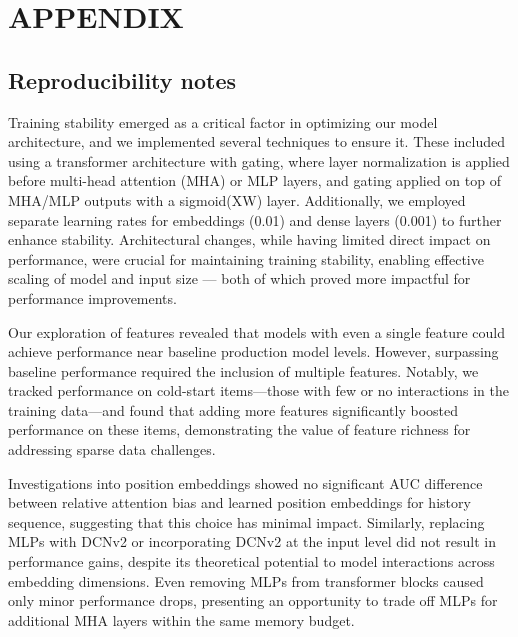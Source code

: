 


\appendix

\section{APPENDIX}

\subsection{Reproducibility notes}
Training stability emerged as a critical factor in optimizing our model architecture, and we implemented several techniques to ensure it. These included using a transformer architecture with gating, where layer normalization is applied before multi-head attention (MHA) or MLP layers, and gating applied on top of MHA/MLP outputs with a sigmoid(XW) layer. Additionally, we employed separate learning rates for embeddings (0.01) and dense layers (0.001) to further enhance stability. Architectural changes, while having limited direct impact on performance, were crucial for maintaining training stability, enabling effective scaling of model and input size — both of which proved more impactful for performance improvements.

Our exploration of features revealed that models with even a single feature could achieve performance near baseline production model levels. However, surpassing baseline performance required the inclusion of multiple features. Notably, we tracked performance on cold-start items—those with few or no interactions in the training data—and found that adding more features significantly boosted performance on these items, demonstrating the value of feature richness for addressing sparse data challenges.

Investigations into position embeddings showed no significant AUC difference between relative attention bias and learned position embeddings for history sequence, suggesting that this choice has minimal impact. Similarly, replacing MLPs with DCNv2 or incorporating DCNv2 at the input level did not result in performance gains, despite its theoretical potential to model interactions across embedding dimensions. Even removing MLPs from transformer blocks caused only minor performance drops, presenting an opportunity to trade off MLPs for additional MHA layers within the same memory budget.

